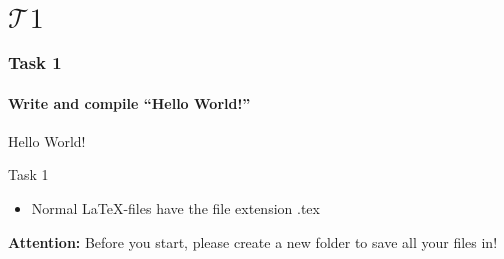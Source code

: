 \section{$\mathcal{T}1$} 
\begin{frame}
\frametitle{Task 1}
\framesubtitle{Write and compile ``Hello World!''}
\begin{center}
\begin{rm}
\Large Hello World!\\
\end{rm}
\end{center}
\bigskip
\bigskip
\bigskip
\begin{block}{Task 1}
\begin{itemize}
\item Normal \LaTeX -files have the file extension {\ttfamily .tex}
\end{itemize}
\end{block}
\begin{alertblock}{\textbf{Attention:}}
Before you start, please create a new folder to save all your files in!
\end{alertblock}
\end{frame}